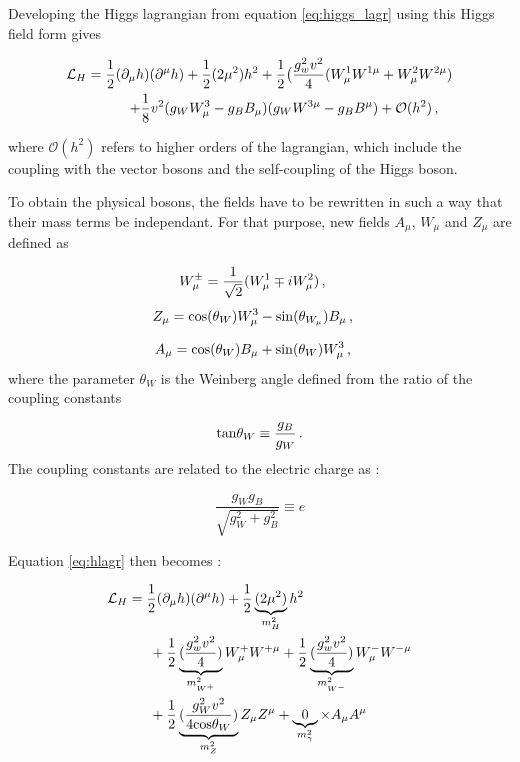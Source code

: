 Developing the Higgs lagrangian from equation \ref{eq:higgs_lagr} using this Higgs field form gives

\begin{align}
    \Lagr_H = \frac{1}{2}(\partial_{\mu}h)(\partial^{\mu}h) + \frac{1}{2}(2\mu^2 )h^2 + \frac{1}{2} \big( \frac{g^{2}_w v^2}{4} (W_{\mu}^1 W^{1\mu} + W_{\mu}^2 W^{2\mu}) \\ + \frac{1}{8} v^2 (g_W W_{\mu}^3 - g_B B_{\mu})(g_W W^{3\mu} - g_B B^{\mu}) + \mathcal{O}(h^2) \msep
    \label{eq:hlagr}
\end{align}

where $\mathcal{O}(h^2)$ refers to higher orders of the lagrangian, which include the coupling with the vector bosons and the self-coupling of the Higgs boson.

To obtain the physical bosons, the fields have to be rewritten in such a way that their mass terms be independant. For that purpose, new fields $A_{\mu}$, $W_{\mu}$ and $Z_{\mu}$ are defined as

\begin{equation}
    W^{\pm}_\mu = \frac{1}{\sqrt{2}}(W_{\mu}^1 \mp iW_{\mu}^2) \msep
\end{equation}
\begin{equation}
    Z_{\mu} = \mathrm{cos}(\theta_{W})W^3_{\mu} - \mathrm{sin}(\theta_{W_{\mu}})B_{\mu} \msep
\end{equation}

\begin{equation}
    A_{\mu} = \mathrm{cos}(\theta_{W})B_{\mu} + \mathrm{sin}(\theta_{W})W_{\mu}^3 \msep
\end{equation}
where the parameter $\theta_W$ is the Weinberg angle \cite{GLASHOW1961579} defined from the ratio of the coupling constants

\begin{equation}
    \mathrm{tan} \theta_W \equiv \frac{g_B}{g_W} \mend
\end{equation}
The coupling constants are related to the electric charge as :

\begin{equation}
    \frac{g_W g_B}{\sqrt{g_{W}^2 + g^{2}_B}} \equiv e
\end{equation}

Equation \ref{eq:hlagr} then becomes :

\begin{align}
    \MoveEqLeft[3]
    \Lagr_H = \frac{1}{2}(\partial_{\mu}h)(\partial^{\mu}h) + \frac{1}{2}\underbrace{(2\mu^2 )}_{m_{H}^2}h^2 \\ {}& + \frac{1}{2} \underbrace{(\frac{g_{w}^2 v^2}{4})}_{m_{W^+}^2} W_{\mu}^+ W^{+\mu} + \frac{1}{2} \underbrace{(\frac{g_{w}^2 v^2}{4})}_{m_{W^-}^2} W_{\mu}^- W^{-\mu} \\ {}& + \frac{1}{2} \underbrace{(\frac{g_W^2 v^2}{4\mathrm{cos}\theta_W})}_{m_Z^2} Z_{\mu} Z^{\mu} + \underbrace{0}_{m_{\gamma}^2}\times A_{\mu}A^{\mu}
\end{align} 

